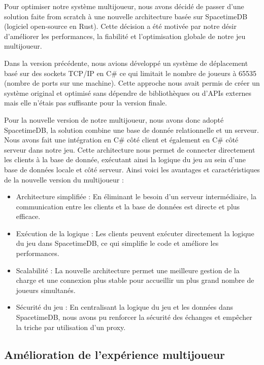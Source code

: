 \documentclass[
	article,			%
	11pt,				%
	oneside,			%
	a4paper,			%
	chapter=TITLE,
	french,			%
	sumario=tradicional
	]{base_nt}
\begin{document}
Pour optimiser notre système multijoueur, nous avons décidé de passer d'une solution faite from scratch à une nouvelle architecture basée sur SpacetimeDB (logiciel open-source en Rust). Cette décision a été motivée par notre désir d'améliorer les performances, la fiabilité et l'optimisation globale de notre jeu multijoueur.

Dans la version précédente, nous avions développé un système de déplacement basé sur des sockets TCP/IP en C\# ce qui limitait le nombre de joueurs à 65535 (nombre de ports sur une machine). Cette approche nous avait permis de créer un système original et optimisé sans dépendre de bibliothèques ou d'APIs externes mais elle n'étais pas suffisante pour la version finale.

Pour la nouvelle version de notre multijoueur, nous avons donc adopté SpacetimeDB, la solution combine une base de donnée relationnelle et un serveur. Nous avons fait une intégration en C\# côté client et également en C\# côté serveur dans notre jeu. Cette architecture nous permet de connecter directement les clients à la base de donnée, exécutant ainsi la logique du jeu au sein d'une base de données locale et côté serveur. Ainsi voici les avantages et caractéristiques de la nouvelle version du multijoueur :

\begin{itemize}
    \item Architecture simplifiée : En éliminant le besoin d'un serveur intermédiaire, la communication entre les clients et la base de données est directe et plus efficace.
    \item Exécution de la logique : Les clients peuvent exécuter directement la logique du jeu dans SpacetimeDB, ce qui simplifie le code et améliore les performances.
    \item Scalabilité : La nouvelle architecture permet une meilleure gestion de la charge et une connexion plus stable pour accueillir un plus grand nombre de joueurs simultanés.
    \item Sécurité du jeu : En centralisant la logique du jeu et les données dans SpacetimeDB, nous avons pu renforcer la sécurité des échanges et empêcher la triche par utilisation d'un proxy.
\end{itemize}

\newpage

\subsection{Amélioration de l'expérience multijoueur}
\end{document}
